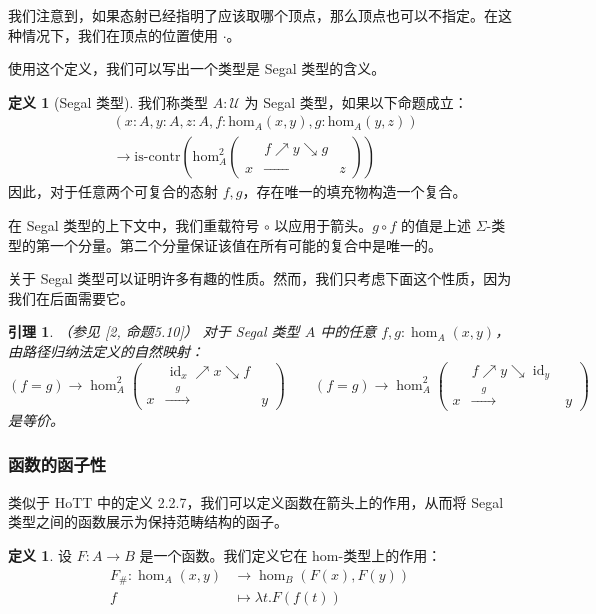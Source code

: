 \documentclass{ctexrep}
\theoremstyle{plain}
\newtheorem{lemma}[theorem]{引理}
\theoremstyle{definition}
\newtheorem{definition}[theorem]{定义}
\theoremstyle{remark}
\theoremstyle{definition}
\theoremstyle{definition}
\theoremstyle{definition}
\newcommand{\id}{\operatorname{id}}
\newcommand{\UU}{\mathcal{U}}
\begin{document}
我们注意到，如果态射已经指明了应该取哪个顶点，那么顶点也可以不指定。在这种情况下，我们在顶点的位置使用 $\cdot$。

使用这个定义，我们可以写出一个类型是 Segal 类型的含义。

\begin{definition}[Segal 类型]
我们称类型 $A:\UU$ 为 Segal 类型，如果以下命题成立：
\[
\begin{aligned}
& (x : A, y : A, z : A, f : \text{hom}_A(x, y), g : \text{hom}_A(y, z)) \\
& \to \text{is-contr} \left( \text{hom}_A^2 \left( 
\begin{matrix} 
& f \nearrow y \searrow g & \\ 
x & \xrightarrow{\quad \quad \quad} & z 
\end{matrix} 
\right) \right)
\end{aligned}
\]
因此，对于任意两个可复合的态射 $f,g$，存在唯一的填充物构造一个复合。
\end{definition}

在 Segal 类型的上下文中，我们重载符号 $\circ$ 以应用于箭头。$g\circ f$ 的值是上述 $\Sigma$-类型的第一个分量。第二个分量保证该值在所有可能的复合中是唯一的。

关于 Segal 类型可以证明许多有趣的性质。然而，我们只考虑下面这个性质，因为我们在后面需要它。

\begin{lemma}（参见 [2, 命题5.10]）
对于 Segal 类型 $A$ 中的任意 $f,g:\hom_A(x,y)$，由路径归纳法定义的自然映射：
\[
(f = g) \to \hom_A^2 \left( 
\begin{matrix} 
& \id_x \nearrow x \searrow f & \\ 
x & \xrightarrow{\quad g \quad} & y 
\end{matrix} 
\right) \quad \quad
(f = g) \to \hom_A^2 \left( 
\begin{matrix} 
& f \nearrow y \searrow \id_y & \\ 
x & \xrightarrow{\quad g \quad} & y 
\end{matrix} 
\right)
\]
是等价。
\end{lemma}

\subsubsection{函数的函子性}

类似于 HoTT 中的定义 2.2.7，我们可以定义函数在箭头上的作用，从而将 Segal 类型之间的函数展示为保持范畴结构的函子。

\begin{definition}
设 $F:A\to B$ 是一个函数。我们定义它在 hom-类型上的作用：
\begin{align*}
F_{\#}:\hom_A(x,y) &\to \hom_B(F(x),F(y)) \\
f &\mapsto \lambda t.F(f(t))
\end{align*}
\end{definition}
\end{document}
